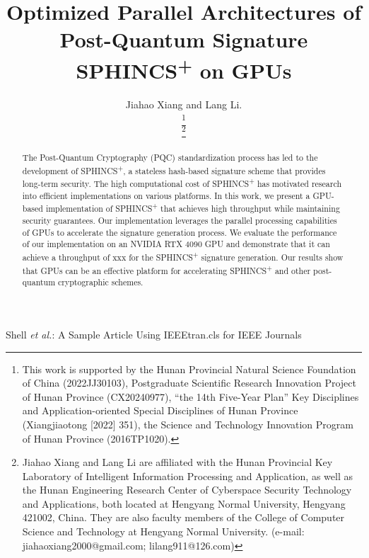 \documentclass[journal]{IEEEtran}
\begin{document}
\title{Optimized Parallel Architectures of Post-Quantum Signature SPHINCS\textsuperscript{+} on GPUs}

\author{Jiahao Xiang and Lang Li.

  \thanks{This work is supported by the Hunan Provincial Natural Science Foundation of China (2022JJ30103), Postgraduate Scientific Research Innovation Project of Hunan Province (CX20240977), “the 14th Five-Year Plan” Key Disciplines and Application-oriented Special Disciplines of Hunan Province (Xiangjiaotong [2022] 351), the Science and Technology Innovation Program of Hunan Province (2016TP1020).}

  \thanks{Jiahao Xiang and Lang Li are affiliated with the Hunan Provincial Key Laboratory of Intelligent Information Processing and Application, as well as the Hunan Engineering Research Center of Cyberspace Security Technology and Applications, both located at Hengyang Normal University, Hengyang 421002, China. They are also faculty members of the College of Computer Science and Technology at Hengyang Normal University. (e-mail: jiahaoxiang2000@gmail.com; lilang911@126.com)}%
}

%
{Shell \MakeLowercase{\textit{et al.}}: A Sample Article Using IEEEtran.cls for IEEE Journals}

\IEEEpubid{}

\maketitle

\begin{abstract}

  The Post-Quantum Cryptography (PQC) standardization process has led to the development of SPHINCS\textsuperscript{+}, a stateless hash-based signature scheme that provides long-term security. The high computational cost of SPHINCS\textsuperscript{+} has motivated research into efficient implementations on various platforms. In this work, we present a GPU-based implementation of SPHINCS\textsuperscript{+} that achieves high throughput while maintaining security guarantees. Our implementation leverages the parallel processing capabilities of GPUs to accelerate the signature generation process. We evaluate the performance of our implementation on an NVIDIA RTX 4090 GPU and demonstrate that it can achieve a throughput of xxx for the SPHINCS\textsuperscript{+} signature generation. Our results show that GPUs can be an effective platform for accelerating SPHINCS\textsuperscript{+} and other post-quantum cryptographic schemes.

\end{abstract}
\end{document}
